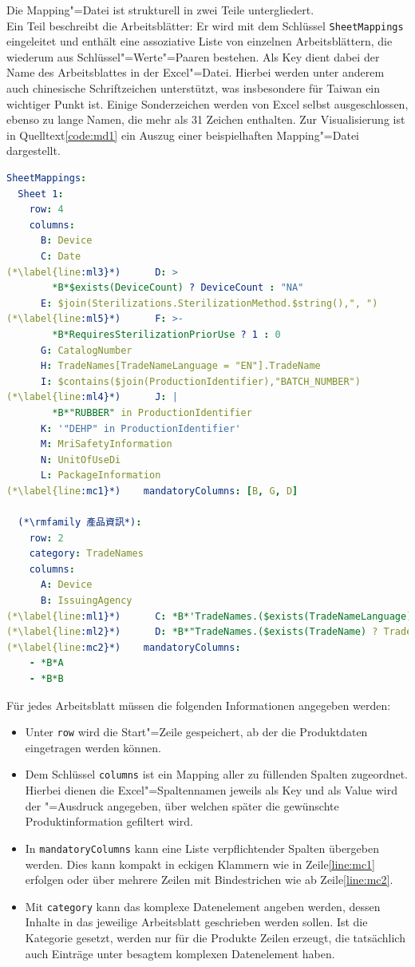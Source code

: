 Die Mapping"=Datei ist strukturell in zwei Teile untergliedert.\\
Ein Teil beschreibt die Arbeitsblätter: Er wird mit dem Schlüssel \texttt{SheetMappings} eingeleitet und enthält eine assoziative Liste von einzelnen Arbeitsblättern, die wiederum aus Schlüssel"=Werte"=Paaren bestehen. Als Key dient dabei der Name des Arbeitsblattes in der Excel"=Datei. Hierbei werden unter anderem auch chinesische Schriftzeichen unterstützt, was insbesondere für Taiwan ein wichtiger Punkt ist. Einige Sonderzeichen werden von Excel selbst ausgeschlossen, ebenso zu lange Namen, die mehr als 31 Zeichen enthalten. 
Zur Visualisierung ist in Quelltext\nbs\ref{code:md1} ein Auszug einer beispielhaften Mapping"=Datei dargestellt.
\begin{lstlisting}[language=yaml,caption={Beispiel einer Mapping-Datei für \texttt{SheetMappings}},label=code:md1]
SheetMappings:
  Sheet 1:
    row: 4
    columns: 
      B: Device
      C: Date
(*\label{line:ml3}*)      D: >
        *B*$exists(DeviceCount) ? DeviceCount : "NA"
      E: $join(Sterilizations.SterilizationMethod.$string(),", ")
(*\label{line:ml5}*)      F: >-
        *B*RequiresSterilizationPriorUse ? 1 : 0
      G: CatalogNumber
      H: TradeNames[TradeNameLanguage = "EN"].TradeName
      I: $contains($join(ProductionIdentifier),"BATCH_NUMBER")
(*\label{line:ml4}*)      J: |
        *B*"RUBBER" in ProductionIdentifier
      K: '"DEHP" in ProductionIdentifier'
      M: MriSafetyInformation
      N: UnitOfUseDi
      L: PackageInformation
(*\label{line:mc1}*)    mandatoryColumns: [B, G, D] 
      
  (*\rmfamily 產品資訊*):
    row: 2
    category: TradeNames
    columns: 
      A: Device 
      B: IssuingAgency
(*\label{line:ml1}*)      C: *B*'TradeNames.($exists(TradeNameLanguage)?TradeNameLanguage:null)'
(*\label{line:ml2}*)      D: *B*"TradeNames.($exists(TradeName) ? TradeName : null)"
(*\label{line:mc2}*)    mandatoryColumns: 
    - *B*A 
    - *B*B
\end{lstlisting}
Für jedes Arbeitsblatt müssen die folgenden Informationen angegeben werden:
\begin{itemize}
\item Unter \texttt{row} wird die Start"=Zeile gespeichert, ab der die Produktdaten eingetragen werden können.
\item Dem Schlüssel \texttt{columns} ist ein Mapping aller zu füllenden Spalten zugeordnet. Hierbei dienen die Excel"=Spaltennamen jeweils als Key und als Value wird der "=Ausdruck angegeben, über welchen später die gewünschte Produktinformation gefiltert wird.
\item In \texttt{mandatoryColumns} kann eine Liste verpflichtender Spalten übergeben werden. Dies kann kompakt in eckigen Klammern wie in Zeile\nbs\ref{line:mc1} erfolgen oder über mehrere Zeilen mit Bindestrichen wie ab Zeile\nbs\ref{line:mc2}.
\item Mit \texttt{category} kann das komplexe Datenelement angeben werden, dessen Inhalte in das jeweilige Arbeitsblatt geschrieben werden sollen. Ist die Kategorie gesetzt, werden nur für die Produkte Zeilen erzeugt, die tatsächlich auch Einträge unter besagtem komplexen Datenelement haben. 
\end{itemize}
